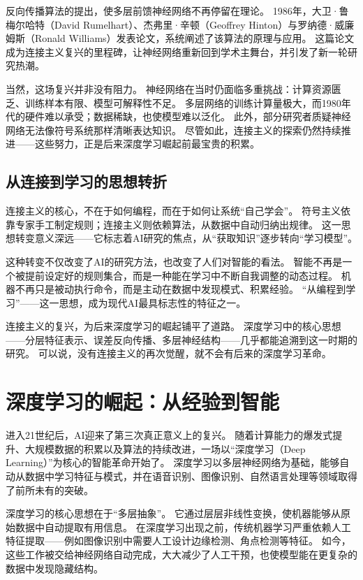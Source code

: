 反向传播算法的提出，使多层前馈神经网络不再停留在理论。  
1986年，大卫·鲁梅尔哈特（David Rumelhart）、杰弗里·辛顿（Geoffrey Hinton）与罗纳德·威廉姆斯（Ronald Williams）发表论文，系统阐述了该算法的原理与应用。  
这篇论文成为连接主义复兴的里程碑，让神经网络重新回到学术主舞台，并引发了新一轮研究热潮。

当然，这场复兴并非没有阻力。  
神经网络在当时仍面临多重挑战：计算资源匮乏、训练样本有限、模型可解释性不足。  
多层网络的训练计算量极大，而1980年代的硬件难以承受；数据稀缺，也使模型难以泛化。  
此外，部分研究者质疑神经网络无法像符号系统那样清晰表达知识。  
尽管如此，连接主义的探索仍然持续推进——这些努力，正是后来深度学习崛起前最宝贵的积累。

\subsection{从连接到学习的思想转折}

连接主义的核心，不在于如何编程，而在于如何让系统“自己学会”。  
符号主义依靠专家手工制定规则；连接主义则依赖算法，从数据中自动归纳出规律。  
这一思想转变意义深远——它标志着AI研究的焦点，从“获取知识”逐步转向“学习模型”。

这种转变不仅改变了AI的研究方法，也改变了人们对智能的看法。  
智能不再是一个被提前设定好的规则集合，而是一种能在学习中不断自我调整的动态过程。  
机器不再只是被动执行命令，而是主动在数据中发现模式、积累经验。  
“从编程到学习”——这一思想，成为现代AI最具标志性的特征之一。

连接主义的复兴，为后来深度学习的崛起铺平了道路。  
深度学习中的核心思想——分层特征表示、误差反向传播、多层神经结构——几乎都能追溯到这一时期的研究。  
可以说，没有连接主义的再次觉醒，就不会有后来的深度学习革命。

\section{深度学习的崛起：从经验到智能}

进入21世纪后，AI迎来了第三次真正意义上的复兴。  
随着计算能力的爆发式提升、大规模数据的积累以及算法的持续改进，一场以“深度学习（Deep Learning）”为核心的智能革命开始了。  
深度学习以多层神经网络为基础，能够自动从数据中学习特征与模式，并在语音识别、图像识别、自然语言处理等领域取得了前所未有的突破。

深度学习的核心思想在于“多层抽象”。  
它通过层层非线性变换，使机器能够从原始数据中自动提取有用信息。  
在深度学习出现之前，传统机器学习严重依赖人工特征提取——例如图像识别中需要人工设计边缘检测、角点检测等特征。  
如今，这些工作被交给神经网络自动完成，大大减少了人工干预，也使模型能在更复杂的数据中发现隐藏结构。

